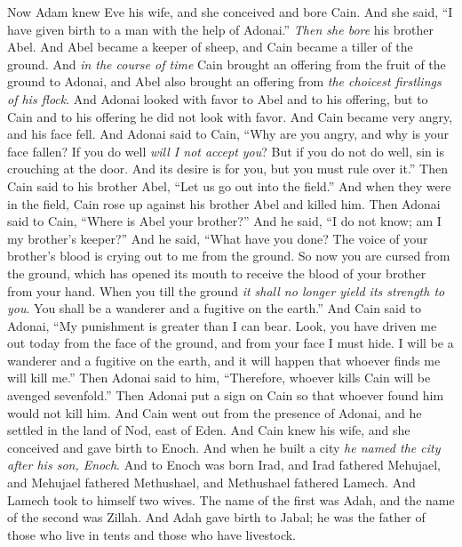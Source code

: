 \begin{biblechapter} %
 Now Adam knew Eve his wife, and she conceived and bore Cain. And she said, “I have given birth to a man with the help of Adonai.”
\verse \textit{Then she bore} his brother Abel. And Abel became a keeper of sheep, and Cain became a tiller of the ground.
\verse And \textit{in the course of time} Cain brought an offering from the fruit of the ground to Adonai,
\verse and Abel also brought an offering from \textit{the choicest firstlings of his flock}. And Adonai looked with favor to Abel and to his offering,
\verse but to Cain and to his offering he did not look with favor. And Cain became very angry, and his face fell.
\verse And Adonai said to Cain, “Why are you angry, and why is your face fallen?
\verse If you do well \textit{will I not accept you}? But if you do not do well, sin is crouching at the door. And its desire is for you, but you must rule over it.”
\verse Then Cain said to his brother Abel, “Let us go out into the field.” And when they were in the field, Cain rose up against his brother Abel and killed him.
\verse Then Adonai said to Cain, “Where is Abel your brother?” And he said, “I do not know; am I my brother’s keeper?”
\verse And he said, “What have you done? The voice of your brother’s blood is crying out to me from the ground.
\verse So now you are cursed from the ground, which has opened its mouth to receive the blood of your brother from your hand.
\verse When you till the ground \textit{it shall no longer yield its strength to you}. You shall be a wanderer and a fugitive on the earth.”
\verse And Cain said to Adonai, “My punishment is greater than I can bear.
\verse Look, you have driven me out today from the face of the ground, and from your face I must hide. I will be a wanderer and a fugitive on the earth, and it will happen that whoever finds me will kill me.”
\verse Then Adonai said to him, “Therefore, whoever kills Cain will be avenged sevenfold.” Then Adonai put a sign on Cain so that whoever found him would not kill him.
\verse And Cain went out from the presence of Adonai, and he settled in the land of Nod, east of Eden.
\verse And Cain knew his wife, and she conceived and gave birth to Enoch. And when he built a city \textit{he named the city after his son, Enoch}.
\verse And to Enoch was born Irad, and Irad fathered Mehujael, and Mehujael fathered Methushael, and Methushael fathered Lamech.
\verse And Lamech took to himself two wives. The name of the first was Adah, and the name of the second was Zillah.
\verse And Adah gave birth to Jabal; he was the father of those who live in tents and those who have livestock.

\end{biblechapter}
